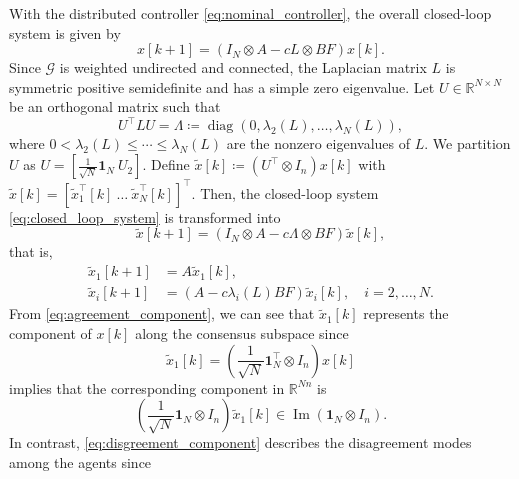 \documentclass[letterpaper,10pt,conference]{ieeeconf}
\newcommand{\R}{\mathbb{R}}
\DeclareMathOperator{\diag}{diag}
\newcommand{\graph}{\mathcal{G}}
\begin{document}
With the distributed controller \eqref{eq:nominal_controller}, the overall closed-loop system is given by
\begin{equation} \label{eq:closed_loop_system}
  x[k+1] = (I_N \otimes A - cL \otimes BF)x[k].
\end{equation}
Since $\graph$ is weighted undirected and connected, the Laplacian matrix $L$ is symmetric positive semidefinite and has a simple zero eigenvalue.
Let $U \in \R^{N \times N}$ be an orthogonal matrix such that
\begin{equation}
  U^\top L U = \Lambda \coloneqq \diag(0,\lambda_2(L),\dots,\lambda_N(L)),
\end{equation}
where $0 < \lambda_2(L) \le \cdots \le \lambda_N(L)$ are the nonzero eigenvalues of $L$.
We partition $U$ as $U = [\tfrac{1}{\sqrt{N}}\mathbf{1}_N \ U_2]$.
Define $\tilde{x}[k] \coloneqq (U^\top \otimes I_n)x[k]$ with $\tilde{x}[k] = [\tilde{x}_1^\top[k]\ \dots\ \tilde{x}_N^\top[k]]^\top$.
Then, the closed-loop system \eqref{eq:closed_loop_system} is transformed into
\begin{equation} \label{eq:closed_loop_system_disagreement}
  \tilde{x}[k+1]
  =
  (I_N \otimes A - c\Lambda \otimes BF)\tilde{x}[k],
\end{equation}
that is,
\begin{align}
  \tilde{x}_1[k+1] &= A \tilde{x}_1[k], \label{eq:agreement_component}\\
  \tilde{x}_i[k+1] &= (A-c\lambda_i(L)BF) \tilde{x}_i[k],\quad i=2,\dots,N. \label{eq:disgreement_component}
\end{align}
From \eqref{eq:agreement_component}, we can see that $\tilde{x}_1[k]$ represents the component of $x[k]$ along the consensus subspace since
\begin{equation}
  \tilde{x}_1[k] = \left(\frac{1}{\sqrt{N}}\mathbf{1}_N^\top \otimes I_n\right) x[k]
\end{equation}
implies that the corresponding component in $\R^{Nn}$ is
\begin{equation}
  \left(\frac{1}{\sqrt{N}}\mathbf{1}_N \otimes I_n\right)\tilde{x}_1[k] \in \operatorname{Im}(\mathbf{1}_N \otimes I_n).
\end{equation}
In contrast, \eqref{eq:disgreement_component} describes the disagreement modes among the agents since
\end{document}
